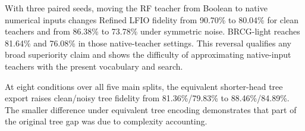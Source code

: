 With three paired seeds, moving the RF teacher from Boolean to native numerical inputs changes Refined LFIO fidelity from 90.70\% to 80.04\% for clean teachers and from 86.38\% to 73.78\% under symmetric noise. BRCG-light reaches 81.64\% and 76.08\% in those native-teacher settings. This reversal qualifies any broad superiority claim and shows the difficulty of approximating native-input teachers with the present vocabulary and search.

At eight conditions over all five main splits, the equivalent shorter-head tree export raises clean/noisy tree fidelity from 81.36\%/79.83\% to 88.46\%/84.89\%. The smaller difference under equivalent tree encoding demonstrates that part of the original tree gap was due to complexity accounting.
